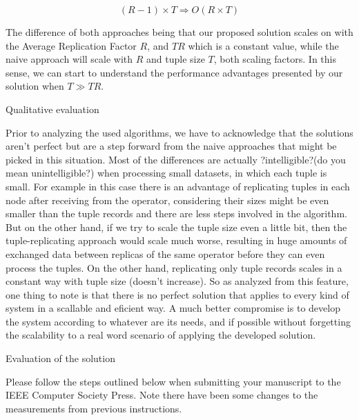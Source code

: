 \documentclass[times, 10pt,twocolumn]{article}
\begin{document}
\[ (R-1)\times T \Rightarrow O(R \times T)\]

The difference of both approaches being that our proposed solution scales
on with the Average Replication Factor $R$, and $TR$ which is a constant
value, while the naive approach will scale with $R$ and tuple size
$T$, both scaling factors. In this sense, we can start to understand the
performance advantages presented by our solution when $T \gg TR$.




Qualitative evaluation


Prior to analyzing the used algorithms, we have to acknowledge that the
solutions aren't perfect but are a step forward from the naive approaches
that might be picked in this situation. Most of the differences are
actually ?intelligible?(do you mean unintelligible?) when processing small
datasets, in which each tuple is small.  For example in this case there is
an advantage of replicating tuples in each node after receiving from the
operator, considering their sizes might be even smaller than the tuple
records and there are less steps involved in the algorithm. But on the
other hand, if we try to scale the tuple size even a little bit, then the
tuple-replicating approach would scale much worse, resulting in huge
amounts of exchanged data between replicas of the same operator before
they can even process the tuples. On the other hand, replicating only
tuple records scales in a constant way with tuple size (doesn't increase).
So as analyzed from this feature, one thing to note is that there is no
perfect solution that applies to every kind of system in a scallable and
eficient way.  A much better compromise is to develop the system according
to whatever are its needs, and if possible without forgetting the
scalability to a real word scenario of applying the developed solution.


Evaluation of the solution


Please follow the steps outlined below when submitting your manuscript to
the IEEE Computer Society Press. Note there have been some changes to the
measurements from previous instructions. 
\end{document}
